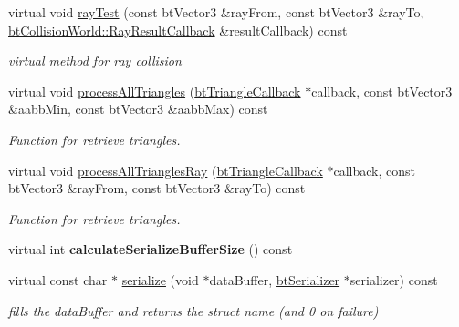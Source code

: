 \begin{DoxyCompactItemize}
\item 
\hypertarget{classbt_g_impact_mesh_shape_a219d87a155aa1cb9af6df7a2413fde47}{virtual void \hyperlink{classbt_g_impact_mesh_shape_a219d87a155aa1cb9af6df7a2413fde47}{ray\+Test} (const bt\+Vector3 \&ray\+From, const bt\+Vector3 \&ray\+To, \hyperlink{structbt_collision_world_1_1_ray_result_callback}{bt\+Collision\+World\+::\+Ray\+Result\+Callback} \&result\+Callback) const }\label{classbt_g_impact_mesh_shape_a219d87a155aa1cb9af6df7a2413fde47}

\begin{DoxyCompactList}\small\item\em virtual method for ray collision \end{DoxyCompactList}\item 
virtual void \hyperlink{classbt_g_impact_mesh_shape_a0b3a0f7b06feb5e2e1fa94f2b5fcd4c7}{process\+All\+Triangles} (\hyperlink{classbt_triangle_callback}{bt\+Triangle\+Callback} $\ast$callback, const bt\+Vector3 \&aabb\+Min, const bt\+Vector3 \&aabb\+Max) const 
\begin{DoxyCompactList}\small\item\em Function for retrieve triangles. \end{DoxyCompactList}\item 
virtual void \hyperlink{classbt_g_impact_mesh_shape_a80b60d4ca87b2739b2389258e901900d}{process\+All\+Triangles\+Ray} (\hyperlink{classbt_triangle_callback}{bt\+Triangle\+Callback} $\ast$callback, const bt\+Vector3 \&ray\+From, const bt\+Vector3 \&ray\+To) const 
\begin{DoxyCompactList}\small\item\em Function for retrieve triangles. \end{DoxyCompactList}\item 
\hypertarget{classbt_g_impact_mesh_shape_a95d6a4772e5f71a3f02ade5fadaf26e6}{virtual int {\bfseries calculate\+Serialize\+Buffer\+Size} () const }\label{classbt_g_impact_mesh_shape_a95d6a4772e5f71a3f02ade5fadaf26e6}

\item 
\hypertarget{classbt_g_impact_mesh_shape_a52fb7b4c6cbb81e7041e88b04cd3e89c}{virtual const char $\ast$ \hyperlink{classbt_g_impact_mesh_shape_a52fb7b4c6cbb81e7041e88b04cd3e89c}{serialize} (void $\ast$data\+Buffer, \hyperlink{classbt_serializer}{bt\+Serializer} $\ast$serializer) const }\label{classbt_g_impact_mesh_shape_a52fb7b4c6cbb81e7041e88b04cd3e89c}

\begin{DoxyCompactList}\small\item\em fills the data\+Buffer and returns the struct name (and 0 on failure) \end{DoxyCompactList}\end{DoxyCompactItemize}
